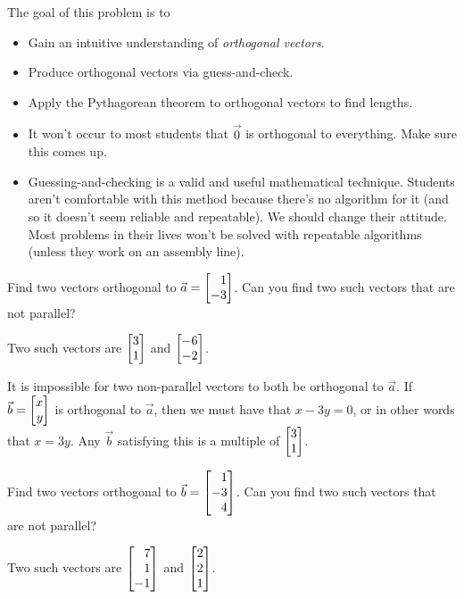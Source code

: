 \documentclass{workbook}
\newcommand{\bookonlynewpage}{\begin{bookonly}\newpage\end{bookonly}}
\begin{document}
\begin{slide}
	\bookonlynewpage

	\question
	\begin{annotation}
		\begin{goals}

			The goal of this problem is to
			\begin{itemize}
				\item Gain an intuitive understanding of \emph{orthogonal vectors}.
				\item Produce orthogonal vectors via guess-and-check.
				\item Apply the Pythagorean theorem to orthogonal vectors to find lengths.
			\end{itemize}
		\end{goals}

		\begin{notes}
			\begin{itemize}
				\item It won't occur to most students that $\vec 0$ is orthogonal to everything. Make sure
					this comes up.
				\item Guessing-and-checking is a valid and useful mathematical technique. Students aren't
					comfortable with this method because there's no algorithm for it (and so it
					doesn't seem reliable and repeatable). We should change their attitude. Most problems
					in their lives won't be solved with repeatable algorithms (unless they work on
					an assembly line).
			\end{itemize}
		\end{notes}
	\end{annotation}
	\begin{parts}
		\item Find two vectors orthogonal to $\vec a=\mat{1\\-3}$.  Can you find
			two such vectors that are not parallel?
			\begin{solution}
				Two such vectors are $\mat{3\\1}$ and $\mat{-6\\-2}$.

				It is impossible for two non-parallel vectors to both be
				orthogonal to $\vec a$. If $\vec b = \mat{x\\y}$ is orthogonal to
				$\vec a$, then we must have that $x - 3y = 0$, or in other words
				that $x = 3y$. Any $\vec b$ satisfying this is a multiple of
				$\mat{3\\1}$.
			\end{solution}
		\item Find two vectors orthogonal to $\vec b=\mat{1\\-3\\4}$.  Can you
			find two such vectors that are not parallel?
			\begin{solution}
				Two such vectors are $\mat{7\\1\\-1}$ and $\mat{2\\2\\1}$.


\end{solution}
\end{parts}
\end{slide}
\end{document}
